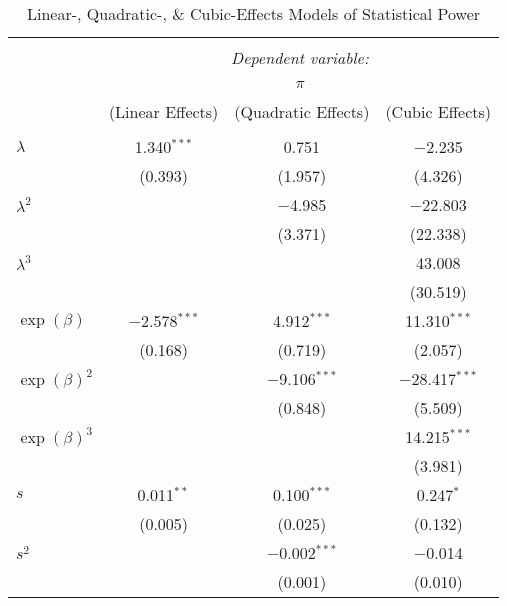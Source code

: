 
\begin{table}[!htbp] \centering 
  \caption[Linear-, Quadratic-, \& Cubic-Effects Models]{Linear-, Quadratic-, \& Cubic-Effects Models of Statistical Power} 
  \label{tbl:lin-quad-cubic} 
\begin{tabular}{@{\extracolsep{5pt}}lccc} 
\\[-1.8ex]\hline 
\hline \\[-1.8ex] 
 & \multicolumn{3}{c}{\textit{Dependent variable:}} \\ 
\cline{2-4} 
\\[-1.8ex] & \multicolumn{3}{c}{$\pi$} \\ 
\\[-1.8ex] & (Linear Effects) & (Quadratic Effects) & (Cubic Effects)\\ 
\hline \\[-1.8ex] 
 $\lambda$ & 1.340$^{***}$ & 0.751 & $-$2.235 \\ 
  & (0.393) & (1.957) & (4.326) \\ 

 $\lambda^2$ &  & $-$4.985 & $-$22.803 \\ 
  &  & (3.371) & (22.338) \\ 

 $\lambda^3$ &  &  & 43.008 \\ 
  &  &  & (30.519) \\ 

 $\exp(\beta)$ & $-$2.578$^{***}$ & 4.912$^{***}$ & 11.310$^{***}$ \\ 
  & (0.168) & (0.719) & (2.057) \\ 

 $\exp(\beta)^2$ &  & $-$9.106$^{***}$ & $-$28.417$^{***}$ \\ 
  &  & (0.848) & (5.509) \\ 

 $\exp(\beta)^3$ &  &  & 14.215$^{***}$ \\ 
  &  &  & (3.981) \\ 

 $s$ & 0.011$^{**}$ & 0.100$^{***}$ & 0.247$^{*}$ \\ 
  & (0.005) & (0.025) & (0.132) \\ 

 $s^2$ &  & $-$0.002$^{***}$ & $-$0.014 \\ 
  &  & (0.001) & (0.010) \\ 


\end{tabular}
\end{table}
